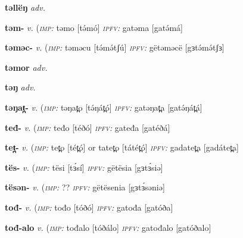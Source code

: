 \newentry
\headword\textbf{təllëŋ}  
\ipa{[təlːɜŋ]}
\synpos\textit{adv.} 

\newentry
\headword\textbf{təm-}  
\ipa{[tə́m-]}
\synpos\textit{v.} 
\imperative(\textit {\textsc{imp:}} təmo [tə́mó]	
\imperfective\textit{\textsc{ipfv:}} gatəma [gatə́má]

\newentry
\headword\textbf{təməc-}  
\ipa{[tɘ́mɘ́tʃ-]}
\synpos\textit{v.} 
\imperative(\textit {\textsc{imp:}} təməcu [tə́mə́tʃú]	
\imperfective\textit{\textsc{ipfv:}} gëtəməcë [gɜtə́mə́tʃɜ]

\newentry
\headword\textbf{təmor}  
\ipa{[təmor]}
\synpos\textit{adv.} 

\newentry
\headword\textbf{təŋ}  
\ipa{[tɘ́ŋ]}
\synpos\textit{adv.} 

\newentry
\headword\textbf{təŋat̪-}  
\ipa{[tə́ŋát̪-]}
\synpos\textit{v.} 
\imperative(\textit {\textsc{imp:}} təŋat̪o [tə́ŋát̪ó]	
\imperfective\textit{\textsc{ipfv:}} gatəŋat̪a [gatə́ŋát̪á]

\newentry
\headword\textbf{teđ-}  
\ipa{[téð-]}
\synpos\textit{v.} 
\imperative(\textit {\textsc{imp:}} teđo [téðó]	
\imperfective\textit{\textsc{ipfv:}} gateđa [gatéðá]

\newentry
\headword\textbf{tet̪-}  
\ipa{[tet̪-]}
\synpos\textit{v.} 
\imperative(\textit {\textsc{imp:}} tet̪o [tét̪ó]	or tatet̪o [tátét̪ó]
\imperfective\textit{\textsc{ipfv:}} gadatet̪a [gadátet̪a]

\newentry
\headword\textbf{tës-}  
\ipa{[tɜ́s-]}
\synpos\textit{v.} 
\imperative(\textit {\textsc{imp:}} tësi [tɜ́sí]	
\imperfective\textit{\textsc{ipfv:}} gëtësia [gɜtɜ́siə]

\newentry
\headword\textbf{tësən-}  
\ipa{[tɜ́sən-]}
\synpos\textit{v.} 
\imperative(\textit {\textsc{imp:}} ??
\imperfective\textit{\textsc{ipfv:}} gëtësenia [gɜtɜ́səniə]

\newentry
\headword\textbf{tođ-}  
\ipa{[tóð-]}
\synpos\textit{v.} 
\imperative(\textit {\textsc{imp:}} tođo [tóðó]	
\imperfective\textit{\textsc{ipfv:}} gatođa [gatóða]

\newentry
\headword\textbf{tođ-alo}  
\ipa{[tóð-alo]}
\synpos\textit{v.} 
\imperative(\textit {\textsc{imp:}} tođalo [tóðálo]	
\imperfective\textit{\textsc{ipfv:}} gatođalo [gatóðalo]

